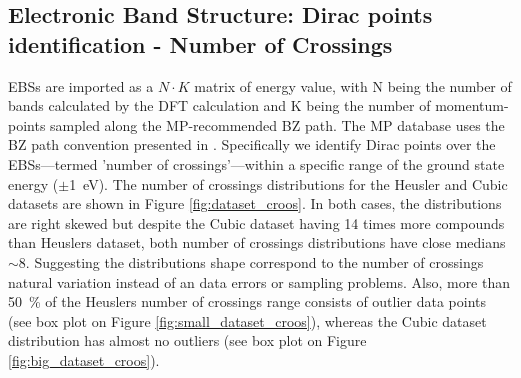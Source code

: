 \documentclass[article]{elsarticle}
\begin{document}
\subsection{Electronic Band Structure: Dirac points identification - Number of Crossings}
EBSs are imported as a $N \cdot K$ matrix of energy value, with N being the number of bands calculated by the DFT calculation and K being the number of momentum-points sampled along the MP-recommended BZ path. The MP database uses the BZ path convention presented in \cite{setyawan2010high}. %
Specifically we identify Dirac points over the EBSs---termed 'number of crossings'---within a specific range of the ground state energy ($\pm$\SI{1}{\electronvolt}). The number of crossings distributions for the Heusler and Cubic datasets are shown in Figure \ref{fig:dataset_croos}. In both cases, the distributions are right skewed but despite the Cubic dataset having \num{14} times more compounds than Heuslers dataset, both number of crossings distributions have close medians $\sim$\num{8}. Suggesting the distributions shape correspond to the number of crossings natural variation instead of an data errors or sampling problems. Also, more than \SI{50}{\percent} of the Heuslers number of crossings range consists of outlier data points (see box plot on Figure \ref{fig:small_dataset_croos}), whereas the Cubic dataset distribution has almost no outliers (see box plot on Figure \ref{fig:big_dataset_croos}).
\end{document}
